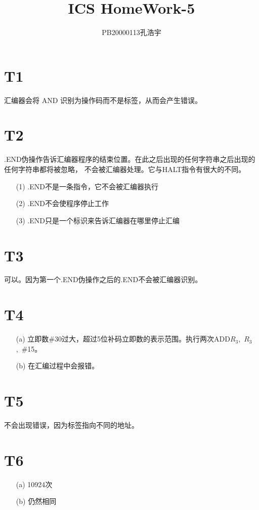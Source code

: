 \documentclass{article}
\title{ICS  HomeWork-5}
\author{PB20000113孔浩宇}
\begin{document}
\maketitle
\section*{T1}
汇编器会将 AND 识别为操作码而不是标签，从而会产生错误。

\section*{T2}
.END伪操作告诉汇编器程序的结束位置。在此之后出现的任何字符串之后出现的任何字符串都将被忽略，
不会被汇编器处理。它与HALT指令有很大的不同。
\begin{enumerate}
    \item [(1)].END不是一条指令，它不会被汇编器执行
    \item [(2)].END不会使程序停止工作
    \item [(3)].END只是一个标识来告诉汇编器在哪里停止汇编
\end{enumerate}

\section*{T3}
可以。因为第一个.END伪操作之后的.END不会被汇编器识别。

\section*{T4}
\begin{enumerate}
    \item [(a)]立即数\#30过大，超过5位补码立即数的表示范围。执行两次ADD\quad $R_3$,\ $R_3$,\ \#15。
    \item [(b)]在汇编过程中会报错。
\end{enumerate} 

\section*{T5}
不会出现错误，因为标签指向不同的地址。

\section*{T6}
\begin{enumerate}
    \item [(a)]10924次
    \item [(b)]仍然相同
\end{enumerate}
\end{document}
